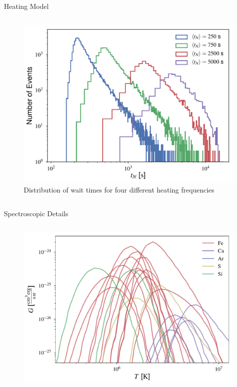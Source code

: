 \documentclass[final]{beamer}
\begin{document}
\begin{frame}
\begin{columns}[T]
\begin{column}{0.49\linewidth}
\begin{block}{Heating Model}
\begin{columns}[T]
\begin{column}{0.49\columnwidth}
\begin{figure}
        \includegraphics[width=\columnwidth]{figures/wait_time_distributions.pdf}
        \caption{Distribution of wait times for four different heating frequencies}
        \label{fig:wait_times}
        \end{figure}
      \end{column}
      \end{columns}
    \end{block}
    \begin{block}{Spectroscopic Details}
      \begin{columns}[T]
        \begin{column}{0.49\columnwidth}
          \begin{figure}
            \includegraphics[width=\columnwidth]{figures/contribution_functions.pdf}    

\end{figure}
\end{column}
\end{columns}
\end{block}
\end{column}
\end{columns}
\end{frame}
\end{document}

